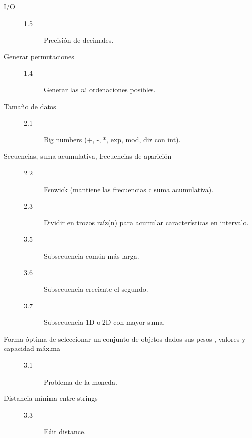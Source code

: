 \begin{description}
	\item [I/O]
	\begin{description}
		\item []
		\item [1.5] Precisión de decimales.
	\end{description}
	\item [Generar permutaciones]
	\begin{description}
		\item []
		\item [1.4] Generar las $n!$ ordenaciones posibles.
	\end{description}
	\item [Tamaño de datos]
	\begin{description}
		\item []
		\item [2.1] Big numbers (+, -, *, exp, mod, div con int).
	\end{description}
	\item [Secuencias, suma acumulativa, frecuencias de aparición]
	\begin{description}
		\item []
		\item [2.2] Fenwick (mantiene las frecuencias o suma acumulativa).
		\item [2.3] Dividir en trozos raíz(n) para acumular características en intervalo.
		\item [3.5] Subsecuencia común más larga.
		\item [3.6] Subsecuencia creciente el segundo.
		\item [3.7] Subsecuencia 1D o 2D con mayor suma.
	\end{description}
	\item [Forma óptima de seleccionar un conjunto de objetos dados sus pesos , valores y capacidad máxima]
	\begin{description}
		\item []
		\item [3.1] Problema de la moneda.
	\end{description}
	\item [Distancia mínima entre strings]
	\begin{description}
		\item []
		\item [3.3] Edit distance.
	\end{description}

\end{description}
